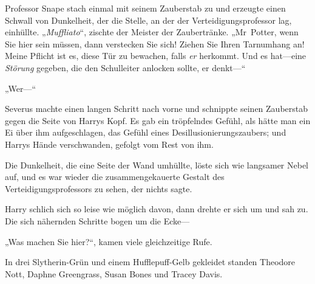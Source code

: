 Professor Snape stach einmal mit seinem Zauberstab zu und erzeugte einen Schwall von Dunkelheit, der die Stelle, an der der Verteidigungsprofessor lag, einhüllte.
„\emph{Muffliato}“, zischte der Meister der Zaubertränke. „Mr~Potter, wenn Sie hier sein müssen, dann verstecken Sie sich! Ziehen Sie Ihren Tarnumhang an! Meine Pflicht ist es, diese Tür zu bewachen, falls \emph{er} herkommt. Und es hat—eine \emph{Störung} gegeben, die den Schulleiter anlocken sollte, er denkt—“

„Wer—“

Severus machte einen langen Schritt nach vorne und schnippte seinen Zauberstab gegen die Seite von Harrys Kopf. Es gab ein tröpfelndes Gefühl, als hätte man ein Ei über ihm aufgeschlagen, das Gefühl eines Desillusionierungszaubers; und Harrys Hände verschwanden, gefolgt vom Rest von ihm.

Die Dunkelheit, die eine Seite der Wand umhüllte, löste sich wie langsamer Nebel auf, und es war wieder die zusammengekauerte Gestalt des Verteidigungsprofessors zu sehen, der nichts sagte.

Harry schlich sich so leise wie möglich davon, dann drehte er sich um und sah zu.
Die sich nähernden Schritte bogen um die Ecke—

„Was machen Sie hier?“, kamen viele gleichzeitige Rufe.

In drei Slytherin-Grün und einem Hufflepuff-Gelb gekleidet standen Theodore Nott, Daphne Greengrass, Susan Bones und Tracey Davis.

